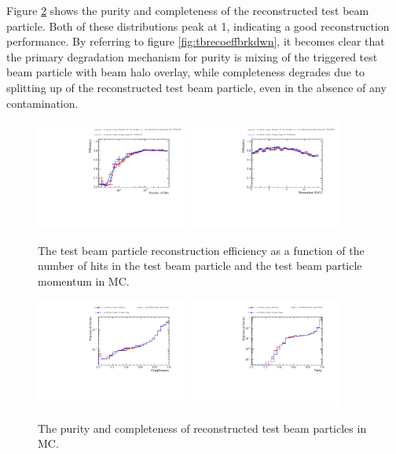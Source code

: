 Figure \ref{fig:tbrecopurcom} shows the purity and completeness of the reconstructed test beam particle.  Both of these distributions peak at 1, indicating a good reconstruction performance. By referring to figure \ref{fig:tbrecoeffbrkdwn}, it becomes clear that the primary degradation mechanism for purity is mixing of the triggered test beam particle with beam halo overlay, while completeness degrades due to splitting up of the reconstructed test beam particle, even in the absence of any contamination.  

\begin{figure}
\includegraphics[width=0.45\textwidth]{Figures/Metrics/MC/Beam/BeamParticleEfficiencyBreakdownVsNHits.pdf}
\includegraphics[width=0.45\textwidth]{Figures/Metrics/MC/Beam/BeamParticleEfficiencyBreakdownVsMomentum.pdf}
\caption{The test beam particle reconstruction efficiency as a function of the number of hits in the test beam particle and the test beam particle momentum in MC.}
\label{fig:tbrecoeff}
\end{figure}

\begin{figure}
\includegraphics[width=0.45\textwidth]{Figures/Metrics/MC/Beam/BeamParticleCompleteness.pdf}
\includegraphics[width=0.45\textwidth]{Figures/Metrics/MC/Beam/BeamParticlePurity.pdf}
\caption{The purity and completeness of reconstructed test beam particles in MC.}
\label{fig:tbrecopurcom}
\end{figure}

